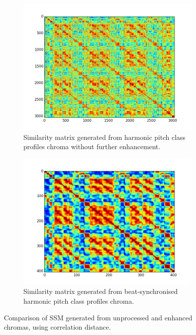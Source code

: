 \begin{figure}
        \centering
        \begin{subfigure}[b]{0.47\textwidth}
                \includegraphics[width=\textwidth]{Figures/hpcp_unsynched_ssm}
                \caption{Similarity matrix generated from harmonic pitch class profiles chroma without further enhancement.}
                \label{fig:unSSM}
        \end{subfigure}%
        \begin{subfigure}[b]{0.47\textwidth}
                \includegraphics[width=\textwidth]{Figures/log_ssm_synched}
                \caption{Similarity matrix generated from beat-synchronised harmonic pitch class profiles chroma.}
                \label{fig:synSSM}
        \end{subfigure}
          \caption{Comparison of SSM generated from unprocessed and enhanced chromas, using correlation distance.}
        \label{fig:ssmcomparison}
\end{figure}

